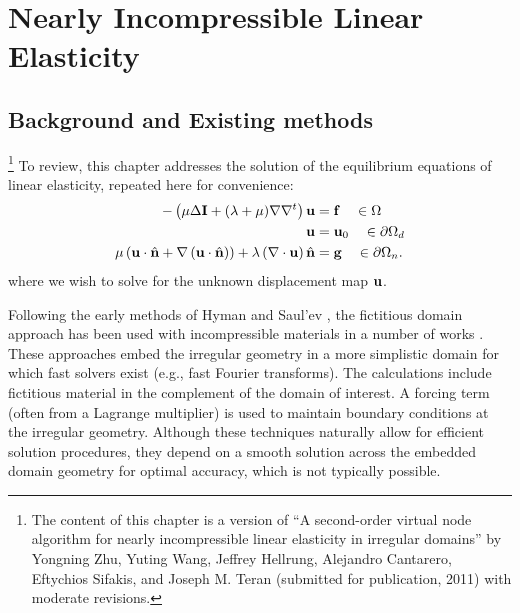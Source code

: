 %

\chapter{Nearly Incompressible Linear Elasticity} \label{chap:partII.LE}

\section{Background and Existing methods} \label{sec:chap5.background}

\footnote{The content of this chapter is a version of ``A second-order virtual node algorithm for nearly incompressible linear elasticity in irregular domains'' by Yongning Zhu, Yuting Wang, Jeffrey Hellrung, Alejandro Cantarero, Eftychios Sifakis, and Joseph M. Teran (submitted for publication, 2011) with moderate revisions.}
To review, this chapter addresses the solution of the equilibrium equations of linear elasticity, repeated here for convenience:
\begin{subequations} \label{eq:chap5.LE}
\begin{align}
-\left( \mu \Delta \mathbf{I} + (\lambda + \mu) \nabla \nabla^t \right) \mathbf{u} & = \mathbf{f} \quad \in \Omega \label{eq:chap5.LE.PDE} \\
\mathbf{u} & = \mathbf{u}_0 \quad \in \partial\Omega_d \label{eq:chap5.LE.D} \\
\mu \left( \mathbf{u} \cdot \hat{\mathbf{n}} + \nabla \left( \mathbf{u} \cdot \hat{\mathbf{n}} \right) \right) + \lambda \left( \nabla \cdot \mathbf{u} \right) \hat{\mathbf{n}} & = \mathbf{g} \quad \in \partial\Omega_n \label{eq:chap5.LE.N}.
\end{align}
\end{subequations}
where we wish to solve for the unknown displacement map $\mathbf{u}$.

Following the early methods of Hyman \cite{Hyman52} and Saul'ev \cite{Saul'ev63}, the fictitious domain approach has been used with incompressible materials in a number of works \cite{Bertrand97, Glowinski94b, Glowinski99, Glowinski01, Biros04, Parussini08, Rutka08, Parussini09, Teran09}. These approaches embed the irregular geometry in a more simplistic domain for which fast solvers exist (e.g., fast Fourier transforms). The calculations include fictitious material in the complement of the domain of interest. A forcing term (often from a Lagrange multiplier) is used to maintain boundary conditions at the irregular geometry. Although these techniques naturally allow for efficient solution procedures, they depend on a smooth solution across the embedded domain geometry for optimal accuracy, which is not typically possible.

